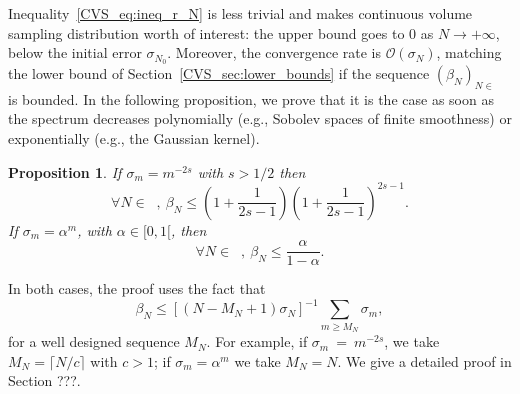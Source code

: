 \documentclass[twoside,11pt]{book}
\newtheorem{proposition}{Proposition}
\numberwithin{theorem}{chapter}
\numberwithin{definition}{chapter}
\numberwithin{proposition}{chapter}
\numberwithin{corollary}{chapter}
\numberwithin{example}{chapter}
\numberwithin{lemma}{chapter}
\numberwithin{assumption}{chapter}
\numberwithin{equation}{chapter}
\numberwithin{figure}{chapter}
\DeclareMathOperator{\Ns}{\mathbb{N}^{*}}
\begin{document}
%
Inequality~\eqref{CVS_eq:ineq_r_N} is less trivial and makes continuous volume sampling distribution worth of interest: the upper bound goes to $0$ as $N \rightarrow +\infty$, below the initial error $\sigma_{N_0}$.
 Moreover, the convergence rate is $\mathcal{O}(\sigma_{N})$, matching the lower bound of Section~\ref{CVS_sec:lower_bounds} if the sequence $(\beta_{N})_{N \in \Ns}$ is bounded. In the following proposition, we prove that it is the case as soon as the spectrum decreases polynomially (e.g., Sobolev spaces of finite smoothness) or exponentially (e.g., the Gaussian kernel).

\begin{proposition}\label{CVS_prop:constant_bound}
If $\sigma_{m} = m^{-2s}$ with $s >1/2$ then
\begin{equation}
\forall N \in \Ns, \: \beta_{N} \leq \left(1+\frac{1}{2s-1}\right)\left(1+\frac{1}{2s-1}\right)^{2s-1}.
\end{equation}
If $\sigma_{m} = \alpha^{m}$, with $\alpha \in [0,1[$, then
\begin{equation}
\forall N \in \Ns, \: \beta_{N} \leq \frac{\alpha}{1-\alpha}.
\end{equation}
\end{proposition}
In both cases, the proof uses the fact that
\begin{equation}
\beta_{N} \leq [(N-M_{N}+1)\sigma_N]^{-1} \sum_{m \geq M_{N}} \sigma_m,
\end{equation}
for a well designed sequence $M_{N}$. For example, if $\sigma_{m}~=~m^{-2s}$, we take $M_{N} = \lceil{N/c \rceil}$ with $c >1$; if $\sigma_{m} = \alpha^{m}$ we take $M_N = N$. We give a detailed proof in Section ???.
\end{document}
